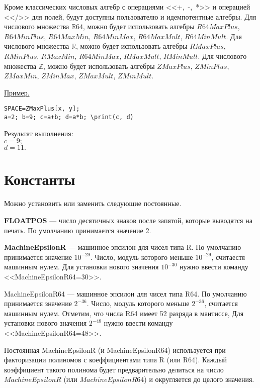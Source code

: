  Кроме классических числовых алгебр с операциями <<+,~-,~*>> и операцией <</>> для полей,  будут доступны 
 пользователю и идемпотентные алгебры.  Для числового множества $\mathbb{R}64$,  можно будет использовать алгебры $R64MaxPlus$,  $R64MinPlus$,  $R64MaxMin$,  $R64MinMax$,  $R64MaxMult$,  $R64MinMult$.  Для числового множества $\mathbb{R}$,  можно будет использовать алгебры $RMaxPlus$,  $RMinPlus$,  $RMaxMin$,  $R64MinMax$,  $RMaxMult$,  $RMinMult$.  Для числового множества $\mathbb{Z}$,  можно будет использовать алгебры $ZMaxPlus$,  $ZMinPlus$, $ZMaxMin$,  $ZMinMax$,  $ZMaxMult$,  $ZMinMult$.  

\smallskip

\underline{Пример. }

\vspace*{-3mm}
\begin{verbatim}
SPACE=ZMaxPlus[x, y];
a=2; b=9; c=a+b; d=a*b; \print(c, d)
\end{verbatim}

Результат выполнения:\\
$c = 9; $\\
$d = 11.$

\section{Константы}
Можно установить или заменить следующие постоянные. 

{\bf FLOATPOS} --- число десятичных знаков после запятой,  которые выводятся на печать. 
По умолчанию принимается значение 2. 

{\bf MachineEpsilonR} --- машинное эпсилон для чисел типа  R. По умолчанию принимается значение $10^{-29}$. 
Число, модуль которого меньше $10^{-29}$, считаестя машинным нулем.  
Для установки нового значения $10^{-30}$ нужно ввести команду <<MachineEpsilonR64=30>>.
 

MachineEpsilonR64 --- машинное эпсилон для чисел типа  R64. По умолчанию принимается значение $2^{-36}$. 
Число, модуль которого меньше $2^{-36}$, считается машинным нулем. 
Отметим, что числа R64  имеет 52 разряда в мантиссе,
Для установки нового значения $2^{-48}$ нужно ввести команду <<MachineEpsilonR64=48>>.

Постоянная MachineEpsilonR (и MachineEpsilonR64) используется при факторизации полиномов
с коеффициентами типа R (или R64). Каждый коэффициент такого полинома будет 
предварительно делиться на число $MachineEpsilonR$ (или $MachineEpsilonR64$) и округляется до целого значения. 


